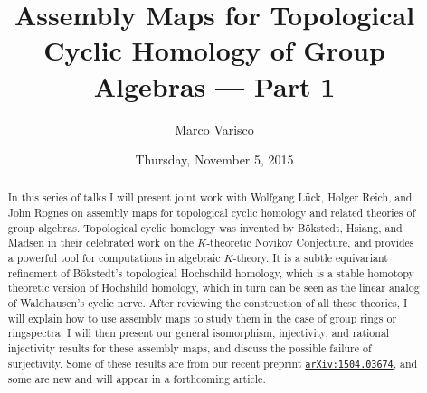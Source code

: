 \documentclass{UAmathtalk}
\author{Marco Varisco}
\title{Assembly Maps for Topological Cyclic Homology of Group Algebras --- Part 1}
\date{Thursday, November 5, 2015}
\begin{document}
\maketitle

\begin{abstract}
In this series of talks I will present joint work with Wolfgang Lück, Holger Reich, and John Rognes on assembly maps for topological cyclic homology and related theories of group algebras.
Topological cyclic homology was invented by Bökstedt, Hsiang, and Madsen in their celebrated work on the $K$-theoretic Novikov Conjecture, and provides a powerful tool for computations in algebraic $K$-theory.
It is a subtle equivariant refinement of Bökstedt's topological Hochschild homology, which is a stable homotopy theoretic version of Hochshild homology, which in turn can be seen as the linear analog of Waldhausen's cyclic nerve.
After reviewing the construction of all these theories, I will explain how to use assembly maps to study them in the case of group rings or ringspectra.
I will then present our general isomorphism, injectivity, and rational injectivity results for these assembly maps, and discuss the possible failure of surjectivity.
Some of these results are from our recent preprint \href{https://arxiv.org/abs/1504.03674/}{\texttt{arXiv:1504.03674}}, and some are new and will appear in a forthcoming article.
\end{abstract}
\end{document}
